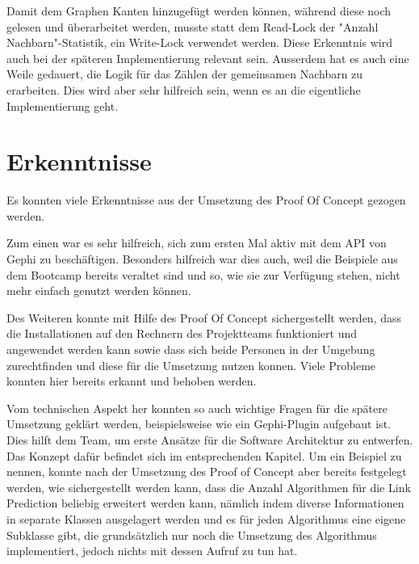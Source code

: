Damit dem Graphen Kanten hinzugefügt werden können, während diese noch gelesen und überarbeitet werden, musste statt
dem Read-Lock der "Anzahl Nachbarn"-Statistik, ein Write-Lock verwendet werden. Diese Erkenntnis wird auch bei der
späteren Implementierung relevant sein. Ausserdem hat es auch eine Weile gedauert, die Logik für das Zählen der
gemeinsamen Nachbarn zu erarbeiten. Dies wird aber sehr hilfreich sein, wenn es an die eigentliche Implementierung geht.

\section{Erkenntnisse}

Es konnten viele Erkenntnisse aus der Umsetzung des Proof Of Concept gezogen werden.

Zum einen war es sehr hilfreich, sich zum ersten Mal aktiv mit dem API von Gephi zu beschäftigen. Besonders hilfreich
war dies auch, weil die Beispiele aus dem Bootcamp bereits veraltet sind und so, wie sie zur Verfügung stehen, nicht
mehr einfach genutzt werden können.

Des Weiteren konnte mit Hilfe des Proof Of Concept sichergestellt werden, dass die Installationen auf den Rechnern des
Projektteams funktioniert und angewendet werden kann sowie dass sich beide Personen in der Umgebung zurechtfinden und
diese für die Umsetzung nutzen konnen. Viele Probleme konnten hier bereits erkannt und behoben werden.

Vom technischen Aspekt her konnten so auch wichtige Fragen für die spätere Umsetzung geklärt werden, beispielsweise
wie ein Gephi-Plugin aufgebaut ist. Dies hilft dem Team, um erste Ansätze für die Software Architektur zu entwerfen.
Das Konzept dafür befindet sich im entsprechenden Kapitel. Um ein Beispiel zu nennen, konnte nach der Umsetzung des
Proof of Concept aber bereits festgelegt werden, wie sichergestellt werden kann, dass die Anzahl Algorithmen für die
Link Prediction beliebig erweitert werden kann, nämlich indem diverse Informationen in separate Klassen ausgelagert
werden und es für jeden Algorithmus eine eigene Subklasse gibt, die grundsätzlich nur noch die Umsetzung des Algorithmus
implementiert, jedoch nichts mit dessen Aufruf zu tun hat. 